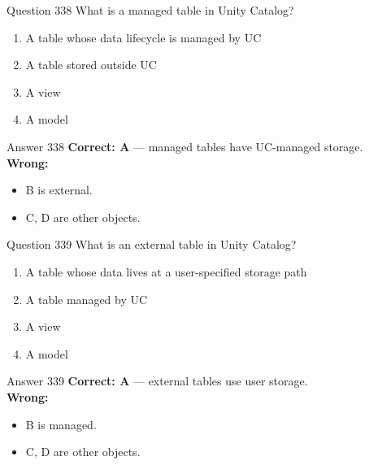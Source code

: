 \documentclass[aspectratio=169,11pt]{beamer}
\begin{document}
	\begin{frame}{Question 338}
		What is a managed table in Unity Catalog?
		\begin{enumerate}[label=\Alph*.]
			\item A table whose data lifecycle is managed by UC
			\item A table stored outside UC
			\item A view
			\item A model
		\end{enumerate}
	\end{frame}
	\begin{frame}{Answer 338}
		\textbf{Correct: A} --- managed tables have UC-managed storage.\\
		\vspace{0.5em}
		\textbf{Wrong:}
		\begin{itemize}
			\item B is external.
			\item C, D are other objects.
		\end{itemize}
	\end{frame}
	
	\begin{frame}{Question 339}
		What is an external table in Unity Catalog?
		\begin{enumerate}[label=\Alph*.]
			\item A table whose data lives at a user-specified storage path
			\item A table managed by UC
			\item A view
			\item A model
		\end{enumerate}
	\end{frame}
	\begin{frame}{Answer 339}
		\textbf{Correct: A} --- external tables use user storage.\\
		\vspace{0.5em}
		\textbf{Wrong:}
		\begin{itemize}
			\item B is managed.
			\item C, D are other objects.
		\end{itemize}
	\end{frame}
	
\end{document}
